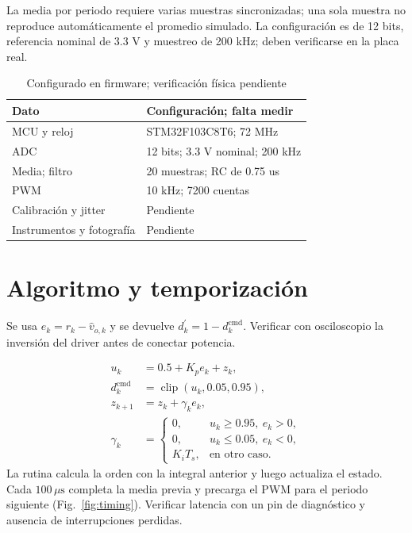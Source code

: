 \documentclass[conference,letterpaper]{IEEEtran}
\begin{document}
La media por periodo requiere varias muestras sincronizadas; una sola muestra no reproduce automáticamente el promedio simulado. La configuración es de 12 bits, referencia nominal de 3.3 V y muestreo de 200 kHz; deben verificarse en la placa real.

\begin{table}[H]\caption{Configurado en firmware; verificación física pendiente}\label{tab:hardware}\centering\footnotesize\setlength{\tabcolsep}{2pt}\renewcommand{\arraystretch}{1.18}\begin{tabularx}{\columnwidth}{LY}\toprule
Dato & Configuración; falta medir\\\midrule
MCU y reloj & STM32F103C8T6; 72 MHz\\
ADC & 12 bits; 3.3 V nominal; 200 kHz\\
Media; filtro & 20 muestras; RC de 0.75 us\\
PWM & 10 kHz; 7200 cuentas\\
Calibración y jitter & Pendiente\\
Instrumentos y fotografía & Pendiente\\\bottomrule\end{tabularx}\end{table}
\section{Algoritmo y temporización}
Se usa $e_k=r_k-\hat v_{o,k}$ y se devuelve $d^{\prime}_k=1-d_k^{\mathrm{cmd}}$. Verificar con osciloscopio la inversión del driver antes de conectar potencia.

\begin{equation}\label{eq:firmware}\begin{aligned}u_k&=0.5+K_pe_k+z_k,\\d_k^{\mathrm{cmd}}&=\operatorname{clip}(u_k,0.05,0.95),\\z_{k+1}&=z_k+\gamma_ke_k,\\\gamma_k&=\begin{cases}0,&u_k\geq0.95,\ e_k>0,\\0,&u_k\leq0.05,\ e_k<0,\\K_iT_s,&\text{en otro caso}.\end{cases}\end{aligned}\end{equation}
La rutina calcula la orden con la integral anterior y luego actualiza el estado. Cada $100\,\mu\mathrm{s}$ completa la media previa y precarga el PWM para el periodo siguiente (Fig.~\ref{fig:timing}). Verificar latencia con un pin de diagnóstico y ausencia de interrupciones perdidas.
\end{document}
